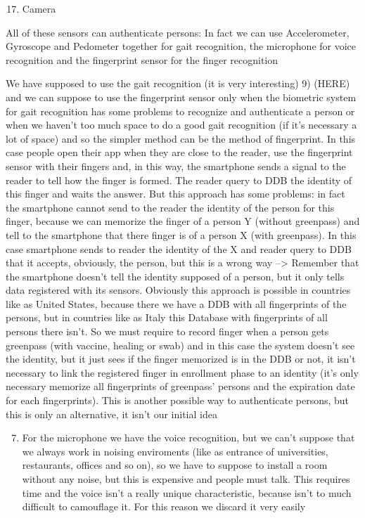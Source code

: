 \documentclass[12pt]{article}
\begin{document}
\begin{enumerate}
  \setcounter{enumi}{16}
  \item Camera
  
\end{enumerate}

All of these sensors can authenticate persons: In fact we can use Accelerometer, Gyroscope and Pedometer together for gait recognition, the microphone for voice recognition and the fingerprint sensor for the finger recognition

We have supposed to use the gait recognition (it is very interesting) 9) (HERE) and we can suppose to use the fingerprint sensor only when the biometric system for gait recognition has some problems to recognize and authenticate a person or when we haven't too much space to do a good gait recognition (if it's necessary a lot of space) and so the simpler method can be the method of fingerprint. In this case people open their app when they are close to the reader, use the fingerprint sensor with their fingers and, in this way, the smartphone sends a signal to the reader to tell how the finger is formed. The reader query to DDB the identity of this finger and waits the answer. But this approach has some problems: in fact the smartphone cannot send to the reader the identity of the person for this finger, because we can memorize the finger of a person Y (without greenpass) and tell to the smartphone that there finger is of a person X (with greenpass). In this case smartphone sends to reader the identity of the X and reader query to DDB that it accepts, obviously, the person, but this is a wrong way --> Remember that the smartphone doesn't tell the identity supposed of a person, but it only tells data registered with its sensors. Obviously this approach is possible in countries like as United States, because there we have a DDB with all fingerprints of the persons, but in countries like as Italy this Database with fingerprints of all persons there isn't. So we must require to record finger when a person gets greenpass (with vaccine, healing or swab) and in this case the system doesn't see the identity, but it just sees if the finger memorized is in the DDB or not, it isn't necessary to link the registered finger in enrollment phase to an identity (it's only necessary memorize all fingerprints of greenpass' persons and the expiration date for each fingerprints). This is another possible way to authenticate persons, but this is only an alternative, it isn't our initial idea

\begin{enumerate}
  \setcounter{enumi}{6}
  \item For the microphone we have the voice recognition, but we can't suppose that we always work in noising enviroments (like as entrance of universities, restaurants, offices and so on), so we have to suppose to install a room without any noise, but this is expensive and people must talk. This requires time and the voice isn't a really unique characteristic, because isn't to much difficult to camouflage it. For this reason we discard it very easily
\end{enumerate}
\end{document}
